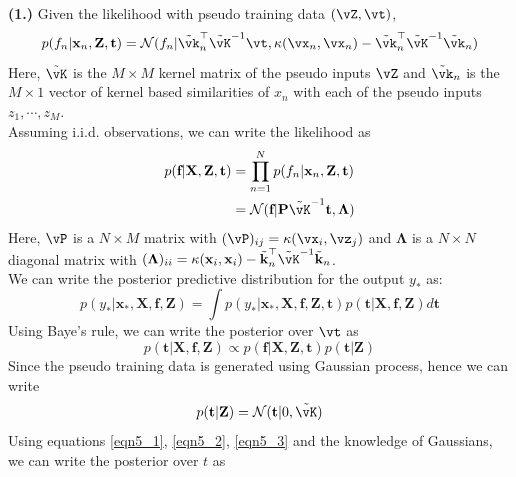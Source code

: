 \documentclass[a4paper,11pt]{article}
\begin{document}
\begin{pmisolution}
\noindent \textbf{(1.)} Given the likelihood with pseudo training data $(\vZ, \vt)$,
\begin{equation*}
p(f_n|\textbf{x}_n, \textbf{Z}, \textbf{t}) = \mathcal{N}(f_n|\Tilde{\vk}_n^\top\Tilde{\vK}^{-1}\vt, \kappa(\vx_n, \vx_n) - \Tilde{\vk}_n^\top\Tilde{\vK}^{-1}\Tilde{\vk}_n)
\end{equation*}
Here, $\Tilde{\vK}$ is the $M \times M$ kernel matrix of the pseudo inputs $\vZ$ and $\Tilde{\vk}_n$ is the $M \times 1$ vector of kernel based similarities of $x_n$ with each of the pseudo inputs $z_1, \cdots , z_M$.\\
Assuming i.i.d. observations, we can write the likelihood as
\begin{equation}
\label{eqn5_1}
\begin{split}
    p(\textbf{f}|\textbf{X}, \textbf{Z}, \textbf{t}) &= \prod_{n=1}^N p(f_n|\textbf{x}_n, \textbf{Z}, \textbf{t}) \\
    &= \mathcal{N}(\textbf{f}|\textbf{P}\Tilde{\vK}^{-1}\textbf{t}, \boldsymbol{\Lambda})
\end{split}
\end{equation}
Here, $\vP$ is a $N \times M$ matrix with $(\vP)_{ij} = \kappa(\vx_i, \vz_j)$ and $\boldsymbol{\Lambda}$ is a $N \times N$ diagonal matrix with $(\boldsymbol{\Lambda})_{ii} = \kappa(\textbf{x}_i, \textbf{x}_i)- \Tilde{\textbf{k}}_n^\top\Tilde{\vK}^{-1}\Tilde{\textbf{k}}_n$.\\
We can write the posterior predictive distribution for the output $y_*$ as:
\begin{equation*}
    p(y_{*}|\textbf{x}_{*}, \textbf{X}, \textbf{f}, \textbf{Z}) = \int p(y_{*}|\textbf{x}_{*}, \textbf{X}, \textbf{f}, \textbf{Z}, \textbf{t})p(\textbf{t}|\textbf{X}, \textbf{f}, \textbf{Z}) d\textbf{t}    
\end{equation*}
Using Baye's rule, we can write the posterior over $\vt$ as
\begin{equation}
\label{eqn5_2}
p(\textbf{t}|\textbf{X}, \textbf{f}, \textbf{Z}) \propto p(\textbf{f}|\textbf{X}, \textbf{Z}, \textbf{t})p(\textbf{t}|\textbf{Z})
\end{equation}
Since the pseudo training data is generated using Gaussian process, hence we can write
\begin{equation}
\label{eqn5_3}
     p(\textbf{t}|\textbf{Z}) = \mathcal{N}(\textbf{t}|0, \Tilde{\vK})
\end{equation}
Using equations \ref{eqn5_1}, \ref{eqn5_2}, \ref{eqn5_3} and the knowledge of Gaussians, we can write the posterior over $t$ as

\end{pmisolution}
\end{document}
